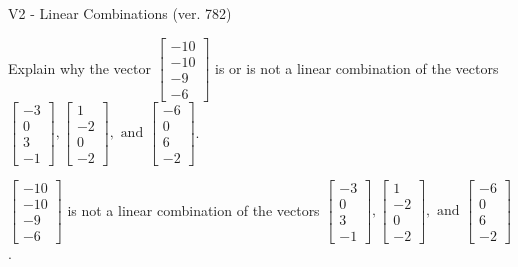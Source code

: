 \begin{exercise}
  \begin{exerciseTitle}V2 - Linear Combinations (ver. 782)\end{exerciseTitle}
  \begin{exerciseStatement}
    Explain why the vector \(\left[\begin{array}{c}
-10 \\
-10 \\
-9 \\
-6
\end{array}\right]\)  is or is not a linear 
	combination of the vectors \(\left[\begin{array}{c}
-3 \\
0 \\
3 \\
-1
\end{array}\right] , \left[\begin{array}{c}
1 \\
-2 \\
0 \\
-2
\end{array}\right] , \text{ and } \left[\begin{array}{c}
-6 \\
0 \\
6 \\
-2
\end{array}\right]\).
	


  \end{exerciseStatement}
  \begin{exerciseAnswer}
   \(\left[\begin{array}{c}
-10 \\
-10 \\
-9 \\
-6
\end{array}\right]\) 
  	 is not  
	a linear combination of the vectors \(\left[\begin{array}{c}
-3 \\
0 \\
3 \\
-1
\end{array}\right] , \left[\begin{array}{c}
1 \\
-2 \\
0 \\
-2
\end{array}\right] , \text{ and } \left[\begin{array}{c}
-6 \\
0 \\
6 \\
-2
\end{array}\right]\).

	
  


  \end{exerciseAnswer}
\end{exercise}